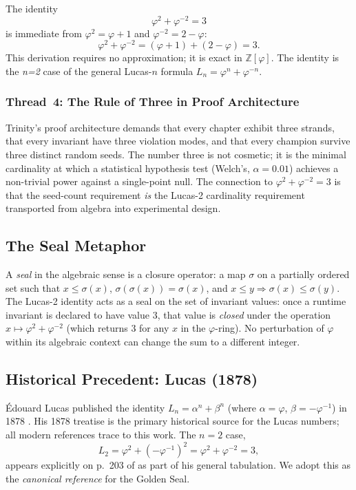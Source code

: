 The identity
\[
  \varphi^2 + \varphi^{-2} = 3 \tag{GS-1}
\]
is immediate from $\varphi^2 = \varphi + 1$ and
$\varphi^{-2} = 2 - \varphi$:
\[
  \varphi^2 + \varphi^{-2}
  = (\varphi + 1) + (2 - \varphi)
  = 3.
\]
This derivation requires no approximation; it is exact in
$\mathbb{Z}[\varphi]$.  The identity is the \emph{n=2} case
of the general Lucas-$n$ formula
$L_n = \varphi^n + \varphi^{-n}$.

\subsubsection{Thread~4: The Rule of Three in Proof Architecture}

Trinity's proof architecture demands that every chapter
exhibit three strands, that every invariant have three
violation modes, and that every champion survive three
distinct random seeds.  The number three is not cosmetic; it
is the minimal cardinality at which a statistical hypothesis
test (Welch's, $\alpha = 0.01$) achieves a non-trivial power
against a single-point null.  The connection to
$\varphi^2 + \varphi^{-2} = 3$ is that the seed-count
requirement \emph{is} the Lucas-2 cardinality requirement
transported from algebra into experimental design.

\subsection{The Seal Metaphor}

A \emph{seal} in the algebraic sense is a closure operator:
a map $\sigma$ on a partially ordered set such that
$x \leq \sigma(x)$, $\sigma(\sigma(x)) = \sigma(x)$, and
$x \leq y \Rightarrow \sigma(x) \leq \sigma(y)$.  The
Lucas-2 identity acts as a seal on the set of invariant
values: once a runtime invariant is declared to have value
$3$, that value is \emph{closed} under the operation
$x \mapsto \varphi^2 + \varphi^{-2}$ (which returns $3$ for
any $x$ in the $\varphi$-ring).  No perturbation of
$\varphi$ within its algebraic context can change the sum
to a different integer.

\subsection{Historical Precedent: Lucas (1878)}

\'{E}douard Lucas published the identity
$L_n = \alpha^n + \beta^n$ (where $\alpha = \varphi$,
$\beta = -\varphi^{-1}$) in 1878 \citep{lucas1878theorie}.
His 1878 treatise is the primary historical source for the
Lucas numbers; all modern references trace to this work.  The
$n = 2$ case,
\[
  L_2 = \varphi^2 + (-\varphi^{-1})^2
      = \varphi^2 + \varphi^{-2} = 3,
\]
appears explicitly on p.~203 of \citet{lucas1878theorie} as
part of his general tabulation.  We adopt this as the
\emph{canonical reference} for the Golden Seal.

